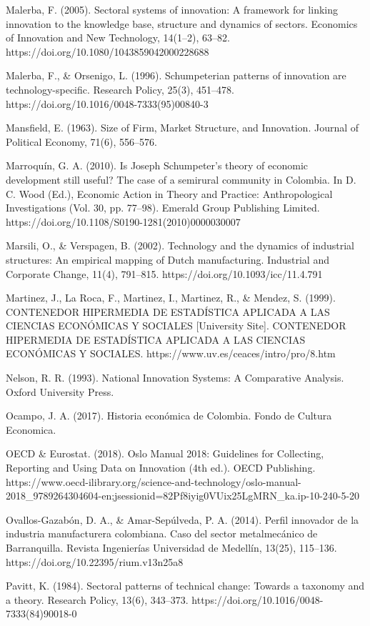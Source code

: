 \documentclass[12pt,a4paper]{article}
\begin{document}
{Malerba, F. (2005). Sectoral systems of innovation: A framework for linking innovation to the knowledge base, structure and dynamics of sectors. Economics of Innovation and New Technology, 14(1–2), 63–82. https://doi.org/10.1080/1043859042000228688

Malerba, F., \& Orsenigo, L. (1996). Schumpeterian patterns of innovation are technology-specific. Research Policy, 25(3), 451–478. https://doi.org/10.1016/0048-7333(95)00840-3

Mansfield, E. (1963). Size of Firm, Market Structure, and Innovation. Journal of Political Economy, 71(6), 556–576.

Marroquín, G. A. (2010). Is Joseph Schumpeter’s theory of economic development still useful? The case of a semirural community in Colombia. In D. C. Wood (Ed.), Economic Action in Theory and Practice: Anthropological Investigations (Vol. 30, pp. 77–98). Emerald Group Publishing Limited. https://doi.org/10.1108/S0190-1281(2010)0000030007

Marsili, O., \& Verspagen, B. (2002). Technology and the dynamics of industrial structures: An empirical mapping of Dutch manufacturing. Industrial and Corporate Change, 11(4), 791–815. https://doi.org/10.1093/icc/11.4.791

Martinez, J., La Roca, F., Martinez, I., Martinez, R., \& Mendez, S. (1999). CONTENEDOR HIPERMEDIA DE ESTADÍSTICA APLICADA A LAS CIENCIAS ECONÓMICAS Y SOCIALES [University Site]. CONTENEDOR HIPERMEDIA DE ESTADÍSTICA APLICADA A LAS CIENCIAS ECONÓMICAS Y SOCIALES. https://www.uv.es/ceaces/intro/pro/8.htm

Nelson, R. R. (1993). National Innovation Systems: A Comparative Analysis. Oxford University Press.

Ocampo, J. A. (2017). Historia económica de Colombia. Fondo de Cultura Economica.

OECD \& Eurostat. (2018). Oslo Manual 2018: Guidelines for Collecting, Reporting and Using Data on Innovation (4th ed.). OECD Publishing. https://www.oecd-ilibrary.org/science-and-technology/oslo-manual-2018\_9789264304604-en;jsessionid=82Pf8iyig0VUix25LgMRN\_ka.ip-10-240-5-20

Ovallos-Gazabón, D. A., \& Amar-Sepúlveda, P. A. (2014). Perfil innovador de la industria manufacturera colombiana. Caso del sector metalmecánico de Barranquilla. Revista Ingenierías Universidad de Medellín, 13(25), 115–136. https://doi.org/10.22395/rium.v13n25a8

Pavitt, K. (1984). Sectoral patterns of technical change: Towards a taxonomy and a theory. Research Policy, 13(6), 343–373. https://doi.org/10.1016/0048-7333(84)90018-0

}
\end{document}
